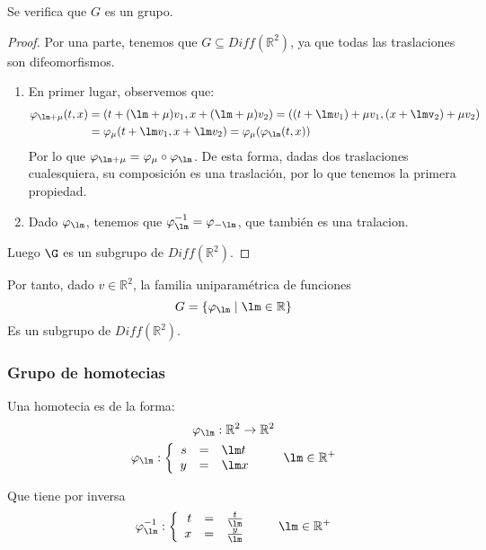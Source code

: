 \begin{prop}
    Se verifica que $G$ es un grupo.

    \begin{proof}
        Por una parte, tenemos que $G\subseteq Diff(\mathbb{R}^2)$, ya que todas las traslaciones son difeomorfismos. 
        \begin{enumerate}
            \item En primer lugar, observemos que:
                \begin{align*}
                    \varphi_{\lm + \mu}(t,x) &= (t+(\lm + \mu)v_1, x+(\lm+\mu)v_2) = ((t+\lm v_1)+\mu v_1, (x+\lmv_2)+\mu v_2) \\
                                             &= \varphi_\mu (t+\lm v_1, x+\lm v_2) = \varphi_\mu(\varphi_\lm(t,x))
                \end{align*}
                Por lo que $\varphi_{\lm + \mu} = \varphi_\mu \circ \varphi_\lm$. De esta forma, dadas dos traslaciones cualesquiera, su composición es una traslación, por lo que tenemos la primera propiedad.
            \item Dado $\varphi_\lm$, tenemos que $\varphi_\lm^{-1} = \varphi_{-\lm}$, que también es una tralacion.
        \end{enumerate}
        Luego $\G$ es un subgrupo de $Diff(\mathbb{R}^2)$.
    \end{proof}
\end{prop}
Por tanto, dado $v\in \mathbb{R}^2$, la familia uniparamétrica de funciones
\begin{equation*}
    G = \{\varphi_\lm \mid \lm \in \mathbb{R}\}
\end{equation*}
Es un subgrupo de $Diff(\mathbb{R}^2)$.

\subsubsection{Grupo de homotecias}
Una homotecia es de la forma:
\begin{gather*}
    \varphi_\lm:\mathbb{R}^2 \rightarrow\mathbb{R}^2 \\
    \varphi_\lm: \left\{\begin{array}{rcl}
            s &= &\lm t \\
            y &= &\lm x
    \end{array}\right. \qquad \lm \in \mathbb{R}^+
\end{gather*}

Que tiene por inversa
\begin{equation*}
    \varphi_\lm^{-1}: \left\{\begin{array}{rcl}
            t &= &\frac{t}{\lm}\\
            x &= &\frac{y}{\lm}
    \end{array}\right. \qquad \lm \in \mathbb{R}^+
\end{equation*}

